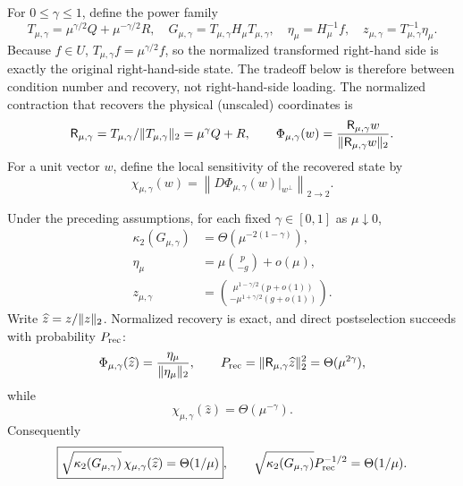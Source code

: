 For $0\leq\gamma\leq1$, define the power family
\begin{equation}
 T_{\mu,\gamma}=\mu^{\gamma/2}Q+\mu^{-\gamma/2}R,\quad
 G_{\mu,\gamma}=T_{\mu,\gamma}H_\mu T_{\mu,\gamma},\quad
 \eta_\mu=H_\mu^{-1}f,\quad z_{\mu,\gamma}=T_{\mu,\gamma}^{-1}\eta_\mu.
 \label{eq:prec-power-congruence}
\end{equation}
Because $f\in U$, $T_{\mu,\gamma}f=\mu^{\gamma/2}f$, so the normalized
transformed right-hand side is exactly the original right-hand-side state.
The tradeoff below is therefore between condition number and recovery, not
right-hand-side loading.  The normalized contraction that recovers the
physical (unscaled) coordinates is
\begin{equation}
 \mathsf R_{\mu,\gamma}=T_{\mu,\gamma}/\lVert T_{\mu,\gamma}\rVert_2
 =\mu^\gamma Q+R,\qquad
 \Phi_{\mu,\gamma}(w)=
 \frac{\mathsf R_{\mu,\gamma}w}{\lVert\mathsf R_{\mu,\gamma}w\rVert_2}.
 \label{eq:prec-recovery-map}
\end{equation}
For a unit vector $w$, define the local sensitivity of the recovered state
by
\begin{equation}
 \chi_{\mu,\gamma}(w)=
 \left\|D\Phi_{\mu,\gamma}(w)|_{w^\perp}\right\|_{2\to2}.
 \label{eq:prec-recovery-sensitivity}
\end{equation}

\begin{theorem}
\label{thm:prec-congruence-frontier}
Under the preceding assumptions, for each fixed $\gamma\in[0,1]$ as
$\mu\downarrow0$,
\begin{align}
 \kappa_2(G_{\mu,\gamma})
 &=\Theta(\mu^{-2(1-\gamma)}),                         \label{eq:prec-congruence-kappa}\\
 \eta_\mu&=\mu\binom{p}{-g}+o(\mu),                    \label{eq:prec-physical-expansion}\\
 z_{\mu,\gamma}&=
 \binom{\mu^{1-\gamma/2}(p+o(1))}
       {-\mu^{1+\gamma/2}(g+o(1))}.                    \label{eq:prec-scaled-expansion}
\end{align}
Write $\widehat z=z/\lVert z\rVert_2$.  Normalized recovery is exact, and direct
postselection succeeds with probability $P_{\rm rec}$:
\begin{equation}
 \Phi_{\mu,\gamma}(\widehat z)
 =\frac{\eta_\mu}{\lVert\eta_\mu\rVert_2},\qquad
 P_{\rm rec}=\lVert\mathsf R_{\mu,\gamma}\widehat z\rVert_2^2
 =\Theta(\mu^{2\gamma}),                                \label{eq:prec-recovery-probability}
\end{equation}
while
\begin{equation}
 \chi_{\mu,\gamma}(\widehat z)=\Theta(\mu^{-\gamma}).   \label{eq:prec-recovery-chi}
\end{equation}
Consequently
\begin{equation}
 \boxed{\sqrt{\kappa_2(G_{\mu,\gamma})}\,
 \chi_{\mu,\gamma}(\widehat z)=\Theta(1/\mu)},
 \qquad
 \sqrt{\kappa_2(G_{\mu,\gamma})}P_{\rm rec}^{-1/2}
 =\Theta(1/\mu).                                         \label{eq:prec-congruence-product}
\end{equation}
\end{theorem}

